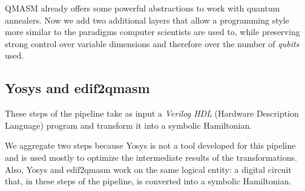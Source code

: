 \begin{listing}[h]
	\caption{Circuit satisfiability results}
	\label{lst:qmasm_res}
\end{listing}

QMASM already offers some powerful abstractions to work with quantum annealers. Now we add two additional layers that allow a programming style more similar to the paradigms computer scientists are used to, while preserving strong control over variable dimensions and therefore over the number of \emph{qubits} used.

\subsection{Yosys and edif2qmasm}
\label{sec:yosys_edif2qmasm}
These steps of the pipeline take as input a \emph{Verilog HDL} (Hardware Description Language) program and transform it into a symbolic Hamiltonian. 

We aggregate two steps because Yosys is not a tool developed for this pipeline and is used mostly to optimize the intermediate results of the transformations. Also, Yosys and edif2qmasm work on the same logical entity: a digital circuit that, in these steps of the pipeline, is converted into a symbolic Hamiltonian.

